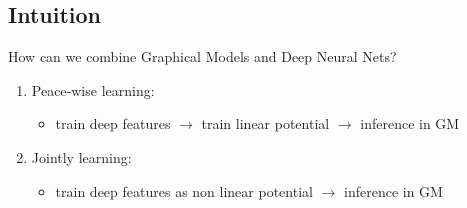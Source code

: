 \documentclass{beamer}
\begin{document}
\subsection*{Intuition}
\begin{frame}
	How can we combine Graphical Models and Deep Neural Nets? 
	\begin{enumerate}
		\item Peace-wise learning:
			\begin{itemize}
				\item train deep features $\rightarrow$ train linear potential $\rightarrow$ inference in GM
			\end{itemize}
		\item Jointly learning:
			\begin{itemize}
				\item train deep features as non linear potential $\rightarrow$ inference in GM
			\end{itemize}
	\end{enumerate}
	
\end{frame}
\end{document}
